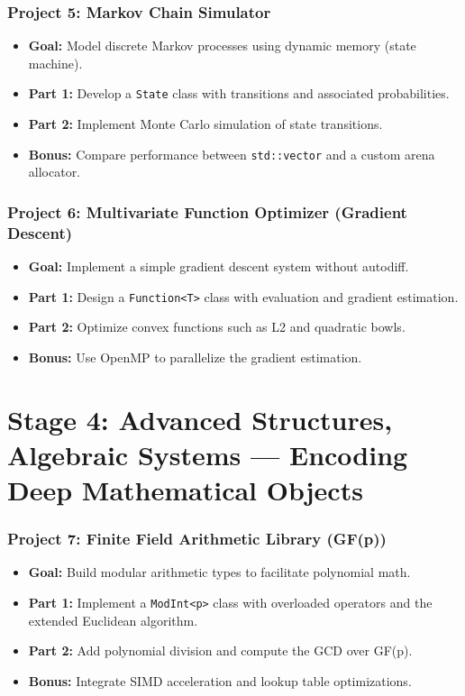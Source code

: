 \documentclass[12pt]{article}
\begin{document}
\subsubsection*{Project 5: Markov Chain Simulator}
\begin{itemize}[leftmargin=*]
    \item \textbf{Goal:} Model discrete Markov processes using dynamic memory (state machine).
    \item \textbf{Part 1:} Develop a \texttt{State} class with transitions and associated probabilities.
    \item \textbf{Part 2:} Implement Monte Carlo simulation of state transitions.
    \item \textbf{Bonus:} Compare performance between \texttt{std::vector} and a custom arena allocator.
\end{itemize}

\subsubsection*{Project 6: Multivariate Function Optimizer (Gradient Descent)}
\begin{itemize}[leftmargin=*]
    \item \textbf{Goal:} Implement a simple gradient descent system without autodiff.
    \item \textbf{Part 1:} Design a \texttt{Function<T>} class with evaluation and gradient estimation.
    \item \textbf{Part 2:} Optimize convex functions such as L2 and quadratic bowls.
    \item \textbf{Bonus:} Use OpenMP to parallelize the gradient estimation.
\end{itemize}

\section{Stage 4: Advanced Structures, Algebraic Systems --- Encoding Deep Mathematical Objects}
\subsubsection*{Project 7: Finite Field Arithmetic Library (GF(p))}
\begin{itemize}[leftmargin=*]
    \item \textbf{Goal:} Build modular arithmetic types to facilitate polynomial math.
    \item \textbf{Part 1:} Implement a \texttt{ModInt<p>} class with overloaded operators and the extended Euclidean algorithm.
    \item \textbf{Part 2:} Add polynomial division and compute the GCD over GF(p).
    \item \textbf{Bonus:} Integrate SIMD acceleration and lookup table optimizations.
\end{itemize}
\end{document}
